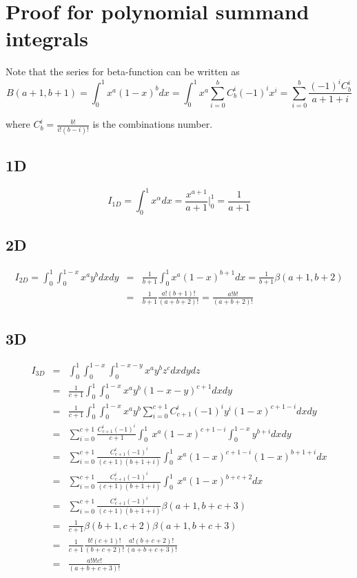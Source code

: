 \section{Proof for polynomial summand integrals}
\label{appendix-proof-simplexintegral}


\noindent
Note that the series for beta-function can be written as
\[B(a+1,b+1) = \int_0^1 x^a (1-x)^b dx = \int_0^1 x^a \sum_{i=0}^b C_b^i (-1)^i x^i = \sum_{i=0}^b \frac{(-1)^i C_b^i}{a+1+i}\]

\noindent
where $C_b^i = \frac{b!}{i!(b-i)!}$ is the combinations number.

\subsection{1D}

\begin{equation}
	I_{1D} = \int_0^1 x^{\alpha} dx = \frac{x^{a + 1}}{a + 1} \biggr |_0^1 = \frac{1}{a + 1}
\end{equation}

\subsection{2D}

\begin{eqnarray*}
	I_{2D} = \int_0^1 \int_0^{1-x} x^{a} y^{b} dx dy
	& = & \frac{1}{b+1} \int_0^1 x^{a} (1-x)^{b+1} dx = \frac{1}{b+1} \beta(a + 1, b + 2) \\
	& = & \frac{1}{b+1} \frac{a!(b+1)!}{(a+b+2)!} = \frac{a!b!}{(a+b+2)!}
\end{eqnarray*}

\subsection{3D}

\begin{eqnarray*}
	I_{3D}
	& = & \int_0^1 \int_0^{1-x} \int_0^{1-x-y} x^a y^b z^c dx dy dz \\
	& = & \frac{1}{c+1} \int_0^1 \int_0^{1-x} x^a y^b (1-x-y)^{c+1} dx dy \\
	& = & \frac{1}{c+1} \int_0^1 \int_0^{1-x} x^a y^b \sum_{i=0}^{c+1} C_{c+1}^i (-1)^i y^i (1-x)^{c+1-i} dx dy \\
	& = & \sum_{i=0}^{c+1} \frac{C_{c+1}^i (-1)^i}{c+1} \int_0^1 \ x^a (1-x)^{c+1-i} \int_0^{1-x} y^{b+i} dx dy \\
	& = & \sum_{i=0}^{c+1} \frac{C_{c+1}^i (-1)^i}{(c+1)(b+1+i)} \int_0^1 \ x^a (1-x)^{c+1-i} (1-x)^{b+1+i} dx \\
	& = & \sum_{i=0}^{c+1} \frac{C_{c+1}^i (-1)^i}{(c+1)(b+1+i)} \int_0^1 \ x^a (1-x)^{b+c+2} dx \\
	& = & \sum_{i=0}^{c+1} \frac{C_{c+1}^i (-1)^i}{(c+1)(b+1+i)} \beta(a+1, b+c+3) \\
	& = & \frac{1}{c+1} \beta(b+1,c+2) \beta(a+1, b+c+3) \\
	& = & \frac{1}{c+1} \frac{b!(c+1)!}{(b+c+2)!} \frac{a! (b+c+2)!}{(a+b+c+3)!} \\
	& = &  \frac{a! b! c!}{(a+b+c+3)!}
\end{eqnarray*}